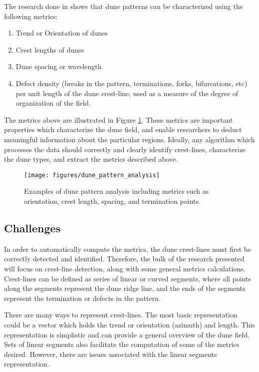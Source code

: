 The research done in \cite{ewing-kocurek-lake-2006,ewing-peyret-kocurek-bourke-2010} shows that dune patterns can be characterized using the following metrics:
\begin{enumerate}
	\item Trend or Orientation of dunes
	\item Crest lengths of dunes
	\item Dune spacing or wavelength
	\item Defect density (breaks in the pattern, terminations, forks, bifurcations, etc) per unit length of the dune crest-line, used as a measure of the degree of organization of the field.
\end{enumerate}

The metrics above are illustrated in Figure \ref{fig:dune_pattern_metrics}. These metrics are important properties which characterize the dune field, and enable researchers to deduct meaningful information about the particular regions. Ideally, any algorithm which processes the data should correctly and clearly identify crest-lines, characterize the dune types, and extract the metrics described above.

\begin{figure}
	\centering
	\texttt{[image: figures/dune\_pattern\_analysis]}
	\caption{Examples of dune pattern analysis including metrics such as orientation, crest length, spacing, and termination points.}
	\label{fig:dune_pattern_metrics}
\end{figure}

\subsection{Challenges}

In order to automatically compute the metrics, the dune crest-lines must first be correctly detected and identified. Therefore, the bulk of the research presented will focus on crest-line detection, along with some general metrics calculations. Crest-lines can be defined as series of linear or curved segments, where all points along the segments represent the dune ridge line, and the ends of the segments represent the termination or defects in the pattern.

There are many ways to represent crest-lines. The most basic representation could be a vector which holds the trend or orientation (azimuth) and length. This representation is simplistic and can provide a general overview of the dune field. Sets of linear segments also facilitate the computation of some of the metrics desired. However, there are issues associated with the linear segments representation.

